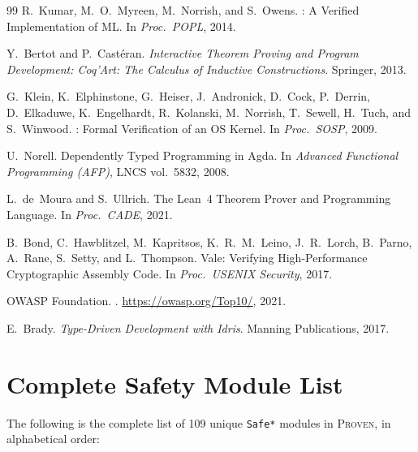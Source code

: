 \documentclass[11pt,a4paper]{article}
\newcommand{\proven}{\textsc{Proven}}
\newcommand{\code}[1]{\texttt{#1}}
\begin{document}
\begin{thebibliography}{99}
R.~Kumar, M.~O.~Myreen, M.~Norrish, and S.~Owens.
: A Verified Implementation of {ML}.
\newblock In \textit{Proc.\ POPL}, 2014.

Y.~Bertot and P.~Cast\'{e}ran.
\newblock \textit{Interactive Theorem Proving and Program Development:
Coq'Art: The Calculus of Inductive Constructions}.
\newblock Springer, 2013.

G.~Klein, K.~Elphinstone, G.~Heiser, J.~Andronick, D.~Cock, P.~Derrin,
D.~Elkaduwe, K.~Engelhardt, R.~Kolanski, M.~Norrish, T.~Sewell,
H.~Tuch, and S.~Winwood.
: Formal Verification of an {OS} Kernel.
\newblock In \textit{Proc.\ SOSP}, 2009.

U.~Norell.
\newblock Dependently Typed Programming in {Agda}.
\newblock In \textit{Advanced Functional Programming (AFP)},
LNCS vol.~5832, 2008.

L.~de~Moura and S.~Ullrich.
\newblock The {Lean~4} Theorem Prover and Programming Language.
\newblock In \textit{Proc.\ CADE}, 2021.

B.~Bond, C.~Hawblitzel, M.~Kapritsos, K.~R.~M.~Leino, J.~R.~Lorch,
B.~Parno, A.~Rane, S.~Setty, and L.~Thompson.
\newblock Vale: Verifying High-Performance Cryptographic Assembly Code.
\newblock In \textit{Proc.\ USENIX Security}, 2017.

OWASP Foundation.
.
\newblock \url{https://owasp.org/Top10/}, 2021.

E.~Brady.
\newblock \textit{Type-Driven Development with Idris}.
\newblock Manning Publications, 2017.

\end{thebibliography}


\appendix

\section{Complete Safety Module List}
\label{sec:module-list}

The following is the complete list of 109 unique \code{Safe*} modules in
\proven{}, in alphabetical order:
\end{document}

